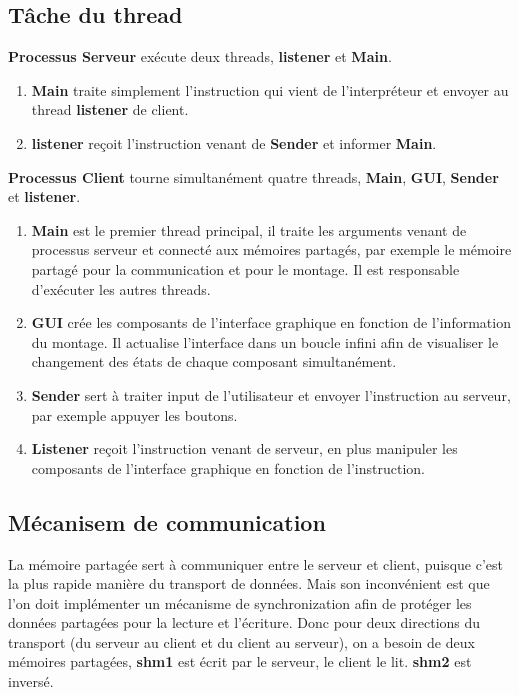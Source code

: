 \documentclass[14px]{article}
\begin{document}
\subsection{Tâche du thread}
\textbf{Processus Serveur} exécute deux threads, \textbf{listener} et \textbf{Main}.
\begin{enumerate}
    \item \textbf{Main} traite simplement l'instruction qui vient de l'interpréteur et envoyer au thread \textbf{listener} de client.
    \item \textbf{listener} reçoit l'instruction venant de \textbf{Sender} et informer \textbf{Main}.
\end{enumerate}

\textbf{Processus Client} tourne simultanément quatre threads, \textbf{Main}, \textbf{GUI}, \textbf{Sender} et \textbf{listener}.
\begin{enumerate}
    \item \textbf{Main} est le premier thread principal, il traite les arguments venant de processus serveur et connecté aux mémoires partagés, par exemple le mémoire partagé pour la communication et pour le montage. Il est responsable d'exécuter les autres threads.
    \item \textbf{GUI} crée les composants de l'interface graphique en fonction de l'information du montage. Il actualise l'interface dans un boucle infini afin de visualiser le changement des états de chaque composant simultanément.
    \item \textbf{Sender} sert à traiter input de l'utilisateur et envoyer l'instruction au serveur, par exemple appuyer les boutons.
    \item \textbf{Listener} reçoit l'instruction venant de serveur, en plus manipuler les composants de l'interface graphique en fonction de l'instruction.
\end{enumerate}

\clearpage

\subsection{Mécanisem de communication}
La mémoire partagée sert à communiquer entre le serveur et client, puisque c'est la plus rapide manière du transport de données. Mais son inconvénient est que l'on doit implémenter un mécanisme de synchronization afin de protéger les données partagées pour la lecture et l'écriture. Donc pour deux directions du transport (du serveur au client et du client au serveur), on a besoin de deux mémoires partagées, \textbf{shm1} est écrit par le serveur, le client le lit. \textbf{shm2} est inversé.\\
\end{document}
